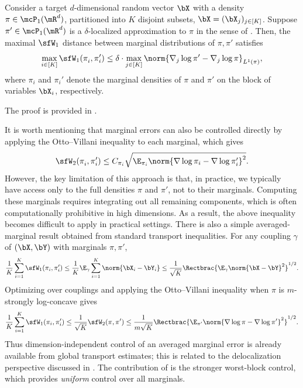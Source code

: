 \documentclass[11pt]{article}
\begin{document}
\begin{thm}
\label{thm:margin}
Consider a target $d$-dimensional random vector $\bX$ with a density $\pi \in \mcP_1(\mR^d)$, partitioned into $K$ disjoint subsets, $\bX = (\bX_j)_{j \in [K]}$.
%
Suppose $\pi'\in \mcP_1(\mR^d)$ is a $\delta$-localized approximation to $\pi$ in the sense of .
Then, the maximal $\sfW_1$ distance between marginal distributions of $\pi,\pi'$ satisfies
\begin{equation}
\label{eqn:MarginIneqn}
    \max_{i\in [K]} \sfW_1 (\pi_i^{}, \pi_i') \le \delta \cdot \max_{j\in [K]} \norm{ \nabla_j \log \pi' - \nabla_j \log \pi }_{L^1(\pi)},
\end{equation}
where $\pi_i$ and $\pi_i'$ denote the marginal densities of $\pi$ and $\pi'$ on the block of variables $\bX_i$, respectively. 
\end{thm}

\noindent The proof is provided in .


It is worth mentioning that marginal errors can also be controlled directly by applying the Otto--Villani inequality \cite{MR1760620} to each marginal, which gives
\begin{equation}
    \sfW_2(\pi_i^{},\pi_i') \le C_{\pi_i} \sqrt{ \E_{\pi_i}\norm{ \nabla \log \pi_i - \nabla \log \pi_i' }^2 }.
\end{equation}
However, the key limitation of this approach is that, in practice, we typically have access only to the full densities $\pi$ and $\pi'$, not to their marginals.
%
Computing these marginals requires integrating out all remaining components, which is often computationally prohibitive in high dimensions. As a result, the above inequality becomes difficult to apply in practical settings.
%
There is also a simple averaged-marginal result obtained from standard transport inequalities.
For any coupling $\gamma$ of $(\bX,\bY)$ with marginals $\pi,\pi'$,
\begin{equation}
\label{eqn:avg_margin_baseline}
    \frac{1}{K}\sum_{i=1}^K \sfW_1(\pi_i,\pi_i')
    \le \frac{1}{K}\E_\gamma \sum_{i=1}^K \norm{\bX_i-\bY_i}
    \le \frac{1}{\sqrt K}\Rectbrac{\E_\gamma \norm{\bX-\bY}^2}^{1/2}.
\end{equation}
Optimizing over couplings and applying the Otto--Villani inequality when $\pi$ is $m$-strongly log-concave gives
\begin{equation}
    \frac{1}{K}\sum_{i=1}^K \sfW_1(\pi_i,\pi_i')
    \le \frac{1}{\sqrt K} \sfW_2(\pi,\pi')
    \le \frac{1}{m\sqrt K} \Rectbrac{ \E_{\pi'} \norm{\nabla \log \pi-\nabla \log \pi'}^2}^{1/2}.
\end{equation}
Thus dimension-independent control of an averaged marginal error is already available from global transport estimates; this is related to the delocalization perspective discussed in \cite{chen2026convergence,lacker2025hierarchical}.
The contribution of  is the stronger worst-block control, which provides \emph{uniform} control over all marginals.
\end{document}
